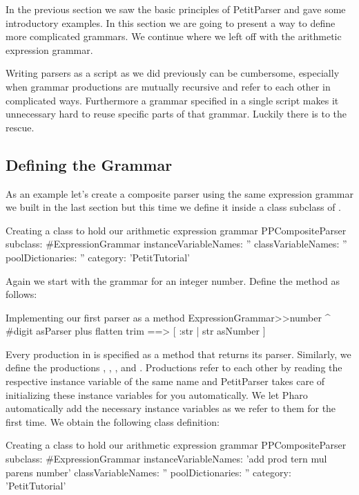 \documentclass[a4paper,10pt,twoside]{book}
\begin{document}
In the previous section we saw the basic principles of PetitParser and
gave some introductory examples. In this section we are going to
present a way to define more complicated grammars. We continue where
we left off with the arithmetic expression grammar.

Writing parsers as a script as we did previously can be cumbersome,
especially when grammar productions are mutually recursive and refer
to each other in complicated ways. Furthermore a grammar specified in
a single script makes it unnecessary hard to reuse specific parts of
that grammar. Luckily there is  to the rescue.

\subsection{Defining the Grammar}

As an example let's create a composite parser using the same
expression grammar we built in the last section but this time we define
it inside a  class subclass of .

\begin{script}{Creating a class to hold our arithmetic expression grammar}
PPCompositeParser subclass: #ExpressionGrammar
   instanceVariableNames: ''
   classVariableNames: ''
   poolDictionaries: ''
   category: 'PetitTutorial'
\end{script}

Again we start with the grammar for an integer number. Define the
method  as follows:

\begin{script}{Implementing our first parser as a method}
ExpressionGrammar>>number
   ^ #digit asParser plus flatten trim ==> [ :str | str asNumber ]
\end{script}

Every production in  is specified as a method
that returns its parser. Similarly, we define the productions
, , , and . Productions refer to
each other by reading the respective instance variable of the same
name and PetitParser takes care of initializing these instance variables
for you automatically. We let Pharo automatically add the necessary
instance variables as we refer to them for the first time. We obtain
the following class definition:

\begin{script}{Creating a class to hold our arithmetic expression grammar}
PPCompositeParser subclass: #ExpressionGrammar
   instanceVariableNames: 'add prod tern mul parens number'
   classVariableNames: ''
   poolDictionaries: ''
   category: 'PetitTutorial'
\end{script}
\end{document}
